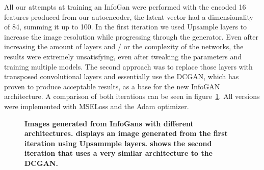         All our attempts at training an InfoGan were performed with the encoded 16 features produced from our autoencoder, the latent vector had a dimensionality of 84, summing it up to 100. In the first iteration we used Upsample layers to increase the image resolution while progressing through the generator. Even after increasing the amount of layers and / or the complexity of the networks, the results were extremely unsatisfying, even after tweaking the parameters and training multiple models. The second approach was to replace those layers with transposed convolutional layers and essentially use the DCGAN, which has proven to produce acceptable results, as a base for the new InfoGAN architecture. A comparison of both iterations can be seen in figure~\ref{fig:infogan_res_1}. All versions were implemented with MSELoss and the Adam optimizer.

        \begin{figure}[ht]
            \centering
            \caption[Images generated from InfoGans with different architectures.]
            {
                \textbf{Images generated from InfoGans with different architectures.  displays an image generated from the first iteration using Upsammple layers.  shows the second iteration that uses a very similar architecture to the DCGAN.}
            }
            \label{fig:infogan_res_1}
        \end{figure}


